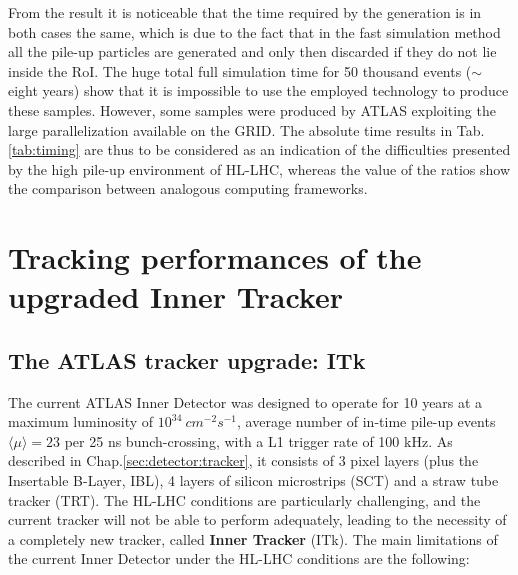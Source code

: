 \documentclass[a4paper,twoside,12pt]{book}
\begin{document}
From the result it is noticeable that the time required by the generation is in both cases
the same, which is due to the fact that in the fast simulation method all the pile-up particles
are generated and only then discarded if they do not lie inside the RoI. The huge total full
simulation time for 50 thousand events ($\sim$ eight years) show that it is impossible to use
the employed technology to produce these samples. However, some samples were
produced by ATLAS exploiting the large parallelization available on the GRID. The absolute time results in Tab.\ref{tab:timing} are thus to be
considered as an indication of the difficulties presented by the high pile-up environment of
HL-LHC, whereas the value of the ratios show the comparison between analogous computing
frameworks. 

\clearpage

\chapter{Tracking performances of the upgraded Inner Tracker}\label{sec:tracking}

\section{The ATLAS tracker upgrade: ITk}
The current ATLAS Inner Detector was designed to operate for 10 years at a maximum luminosity of $10^{34}\ cm^{-2} s^{-1}$, 
average number of in-time pile-up events $\langle\mu\rangle = 23$ per 25 ns bunch-crossing, with a L1 trigger rate of 100 kHz\cite{loi}. As described in Chap.\ref{sec:detector:tracker}, it consists of 3 pixel layers (plus the Insertable B-Layer, IBL), 4 layers of silicon microstrips (SCT)
and a straw tube tracker (TRT). The HL-LHC conditions are particularly challenging, and the current tracker will not be able to perform adequately, leading to the necessity of a completely new tracker, called \textbf{Inner Tracker} (ITk). The main limitations of the current Inner Detector under the HL-LHC conditions are the following:
\end{document}
